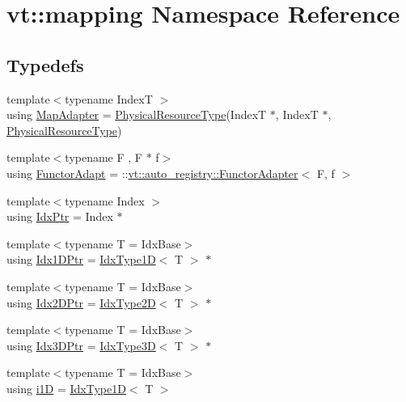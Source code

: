 \hypertarget{namespacevt_1_1mapping}{}\section{vt\+:\+:mapping Namespace Reference}
\label{namespacevt_1_1mapping}
\subsection*{Typedefs}
\begin{DoxyCompactItemize}
\item 
{\footnotesize template$<$typename IndexT $>$ }\\using \hyperlink{namespacevt_1_1mapping_a41b113c28bb6430fbcb5be66e08ccf9f}{Map\+Adapter} = \hyperlink{namespacevt_a2dc36fcada816dc6d11774d650328ee9}{Physical\+Resource\+Type}(IndexT $\ast$, IndexT $\ast$, \hyperlink{namespacevt_a2dc36fcada816dc6d11774d650328ee9}{Physical\+Resource\+Type})
\item 
{\footnotesize template$<$typename F , F $\ast$ f$>$ }\\using \hyperlink{namespacevt_1_1mapping_a9502cb3a918b8389f64351638edab39f}{Functor\+Adapt} = \+::\hyperlink{structvt_1_1auto__registry_1_1_functor_adapter}{vt\+::auto\+\_\+registry\+::\+Functor\+Adapter}$<$ F, f $>$
\item 
{\footnotesize template$<$typename Index $>$ }\\using \hyperlink{namespacevt_1_1mapping_a1bcab0d331bff853fe09c964d5e9cc8c}{Idx\+Ptr} = Index $\ast$
\item 
{\footnotesize template$<$typename T  = Idx\+Base$>$ }\\using \hyperlink{namespacevt_1_1mapping_a8b576cf2f31069778e4951f64bccafd8}{Idx1\+D\+Ptr} = \hyperlink{namespacevt_a36127c6500f2311908c959be653da40e}{Idx\+Type1D}$<$ T $>$ $\ast$
\item 
{\footnotesize template$<$typename T  = Idx\+Base$>$ }\\using \hyperlink{namespacevt_1_1mapping_a6832cbb1361fe72fd7ec730e7b7773b3}{Idx2\+D\+Ptr} = \hyperlink{namespacevt_ab0fbc5ddf69b5aa0ed6a8d1658b504eb}{Idx\+Type2D}$<$ T $>$ $\ast$
\item 
{\footnotesize template$<$typename T  = Idx\+Base$>$ }\\using \hyperlink{namespacevt_1_1mapping_aacc737158b6517f2d760ffc8d1b5abca}{Idx3\+D\+Ptr} = \hyperlink{namespacevt_a65e4a83c0567ecb7a54b78e9b8e7d7ab}{Idx\+Type3D}$<$ T $>$ $\ast$
\item 
{\footnotesize template$<$typename T  = Idx\+Base$>$ }\\using \hyperlink{namespacevt_1_1mapping_af0c14a9a77e0311b3d089143ed93ba76}{i1D} = \hyperlink{namespacevt_a36127c6500f2311908c959be653da40e}{Idx\+Type1D}$<$ T $>$

\end{DoxyCompactItemize}
